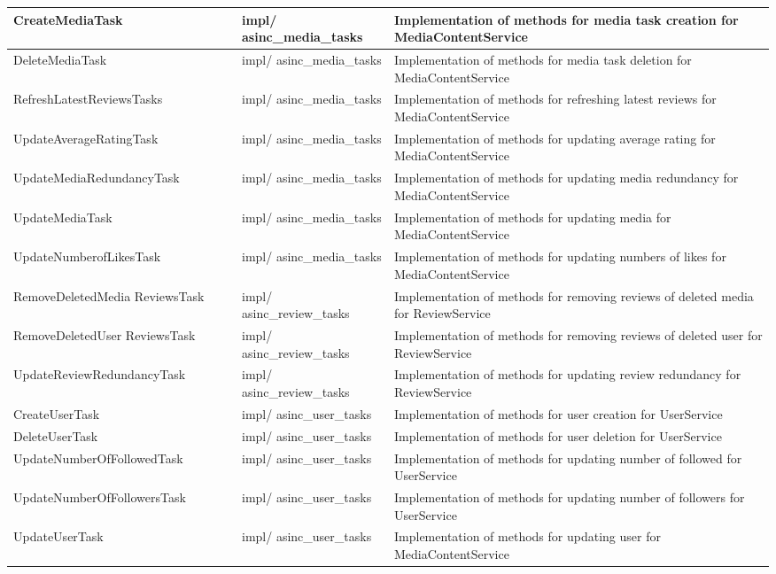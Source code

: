 \begin{longtable}{|>{\raggedright\arraybackslash}m{0.3\linewidth}|>{\raggedright\arraybackslash}m{0.2\linewidth}|>{\raggedright\arraybackslash}m{0.5\linewidth}|}
    CreateMediaTask & impl/ asinc\_media\_tasks & Implementation of methods for media task creation for MediaContentService \\
    \hline
    DeleteMediaTask & impl/ asinc\_media\_tasks & Implementation of methods for media task deletion for MediaContentService \\
    \hline
    RefreshLatestReviewsTasks & impl/ asinc\_media\_tasks & Implementation of methods for refreshing latest reviews for MediaContentService \\
    \hline
    UpdateAverageRatingTask & impl/ asinc\_media\_tasks & Implementation of methods for updating average rating for MediaContentService \\
    \hline
    UpdateMediaRedundancyTask & impl/ asinc\_media\_tasks & Implementation of methods for updating media redundancy for MediaContentService \\
    \hline
    UpdateMediaTask & impl/ asinc\_media\_tasks & Implementation of methods for updating media for MediaContentService \\
    \hline
    UpdateNumberofLikesTask & impl/ asinc\_media\_tasks & Implementation of methods for updating numbers of likes for MediaContentService \\
    \hline
    RemoveDeletedMedia ReviewsTask & impl/ asinc\_review\_tasks & Implementation of methods for removing reviews of deleted media for ReviewService \\
    \hline
    RemoveDeletedUser ReviewsTask & impl/ asinc\_review\_tasks & Implementation of methods for removing reviews of deleted user for ReviewService \\
    \hline
    UpdateReviewRedundancyTask & impl/ asinc\_review\_tasks & Implementation of methods for updating review redundancy for ReviewService \\
    \hline
    CreateUserTask & impl/ asinc\_user\_tasks & Implementation of methods for user creation for UserService \\
    \hline
    DeleteUserTask & impl/ asinc\_user\_tasks & Implementation of methods for user deletion for UserService \\
    \hline
    UpdateNumberOfFollowedTask & impl/ asinc\_user\_tasks & Implementation of methods for updating number of followed for UserService \\
    \hline
    UpdateNumberOfFollowersTask & impl/ asinc\_user\_tasks & Implementation of methods for updating number of followers for UserService \\
    \hline
    UpdateUserTask & impl/ asinc\_user\_tasks & Implementation of methods for updating user for MediaContentService \\

\end{longtable}
